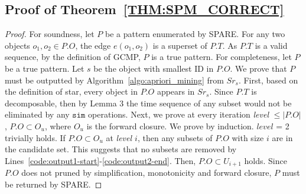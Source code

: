 
\subsection{Proof of Theorem~\ref{THM:SPM_CORRECT}}
\label{apx:spm_correct}
\begin{proof}\vspace{-0.5em}
For soundness, let $P$ be a pattern enumerated by SPARE. For any two objects $o_1, o_2 \in P.O$, the edge $e(o_1,o_2)$ is a superset of $P.T$. 
As $P.T$ is a valid sequence, by the definition of GCMP, $P$ is a true pattern.
For completeness, let $P$ be a true pattern. Let $s$ be the object with smallest ID in $P.O$. We prove that $P$ must be outputted by Algorithm~\ref{algo:apriori_mining} from $Sr_s$. 
First, based on the definition of star, every object in $P.O$ appears in $Sr_s$. Since $P.T$ is decomposable, then by Lemma 3 %
the time sequence of %
any subset would not be eliminated by any $\mathtt{sim}$ operations.  Next, we prove at every iteration \emph{level} $\leq |P.O|$, $P.O \subset O_u$, where $O_u$ is the forward closure. We prove by induction. $level$ = 2 trivially holds. If $P.O \subset O_u$ at \emph{level $i$}, then any subsets of $P.O$ with size $i$ are in the candidate set. %
This suggests that no subsets are removed by Lines~\ref{code:output1-start}-\ref{code:output2-end}. Then, $P.O \subset U_{i+1}$ holds. Since $P.O$ does not pruned by simplification, monotonicity and forward closure, $P$ must be returned by SPARE.
\end{proof}